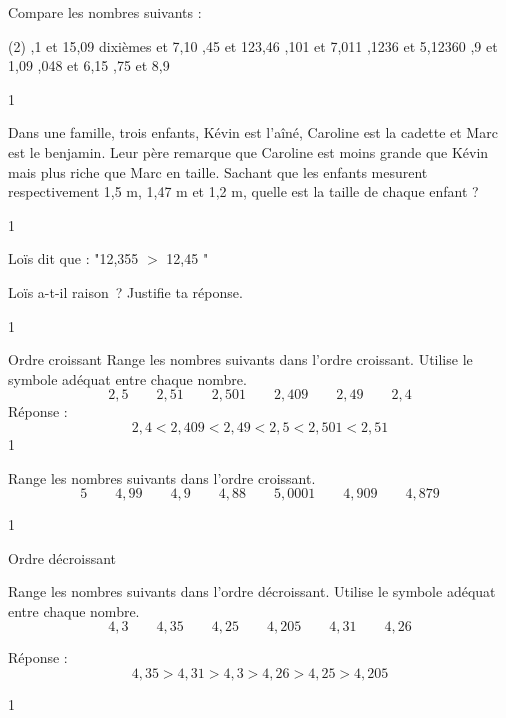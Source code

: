 \documentclass[a4paper,11pt]{report}
\begin{document}
\newpage

\begin{exo}{
Compare les nombres suivants :
\begin{tasks}[after-item-skip = 0.5em, after-skip=-0.5em](2)
,1 et 15,09
 dixièmes et 7,10 
,45 et 123,46
,101 et 7,011
,1236 et 5,12360
,9 et 1,09
,048 et 6,15
,75 et 8,9
\end{tasks}

}{1}\end{exo}

\begin{exo}{Dans une famille, trois enfants, Kévin est  l'aîné, Caroline est la cadette et Marc est le benjamin. Leur père remarque que Caroline est moins grande que Kévin mais plus riche que Marc en taille. Sachant que les enfants mesurent respectivement 1,5 m, 1,47 m et 1,2 m, quelle est la taille de chaque enfant ?

}{1}\end{exo}

\begin{exo}{
Loïs dit que :  "12,355 $>$ 12,45 "
 
Loïs a-t-il raison~? Justifie  ta réponse.


}{1}\end{exo}


\begin{resolu}{Ordre croissant}{
Range les nombres suivants dans l'ordre croissant. Utilise le symbole adéquat entre chaque nombre.
\[2,5 \quad  \quad 2,51 \quad \quad 2,501 \quad \quad 2,409 \quad  \quad 2,49 \quad  \quad 2,4\] 
Réponse : 
\[2,4 < 2,409 < 2,49 < 2,5 < 2,501 < 2,51\]
}{1}
\end{resolu}

\begin{exo}{
Range les nombres suivants dans l'ordre croissant.
\[5 \quad  \quad 4,99 \quad  \quad 4,9 \quad  \quad 4,88 \quad  \quad 5,0001 \quad  \quad 4,909 \quad  \quad 4,879 \]

}{1}\end{exo}

\begin{resolu}{Ordre décroissant}{
Range les nombres suivants dans l'ordre décroissant. Utilise le symbole adéquat entre chaque nombre.
\[4,3 \quad  \quad 4,35 \quad \quad 4,25 \quad \quad 4,205 \quad  \quad 4,31 \quad  \quad 4,26 \]

Réponse : 
\[4,35 > 4,31 > 4,3 > 4,26 > 4,25 > 4,205\]
}{1}
\end{resolu}
\end{document}
